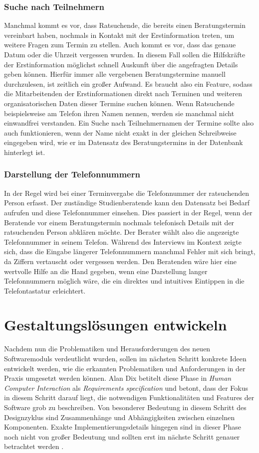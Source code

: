 \subsubsection{Suche nach Teilnehmern}
Manchmal kommt es vor, dass Ratsuchende, die bereits einen Beratungstermin
vereinbart haben, nochmals in Kontakt mit der Erstinformation treten, um
weitere Fragen zum Termin zu stellen. Auch kommt es vor, dass das genaue Datum
oder die Uhrzeit vergessen wurden. In diesem Fall sollen die Hilfskräfte der
Erstinformation möglichst schnell Auskunft über die angefragten Details geben
können. Hierfür immer alle vergebenen Beratungstermine manuell durchzulesen,
ist zeitlich ein großer Aufwand. Es braucht also ein Feature, sodass die
Mitarbeitenden der Erstinformationen direkt nach Terminen und weiteren
organisatorischen Daten dieser Termine suchen können. Wenn Ratsuchende
beispielsweise am Telefon ihren Namen nennen, werden sie manchmal nicht
einwandfrei verstanden. Ein Suche nach Teilnehmernamen der Termine sollte also
auch funktionieren, wenn der Name nicht exakt in der gleichen Schreibweise
eingegeben wird, wie er im Datensatz des Beratungstermins in der Datenbank
hinterlegt ist.

\subsubsection{Darstellung der Telefonnummern}
In der Regel wird bei einer Terminvergabe die Telefonnummer der ratsuchenden
Person erfasst. Der zuständige Studienberatende kann den Datensatz bei Bedarf
aufrufen und diese Telefonnummer einsehen. Dies passiert in der Regel, wenn der
Beratende vor einem Beratungstermin nochmals telefonisch Details mit der
ratsuchenden Person abklären möchte. Der Berater wählt also die angezeigte
Telefonnummer in seinem Telefon. Während des Interviews im Kontext zeigte sich,
dass die Eingabe längerer Telefonnummern manchmal Fehler mit sich bringt, da
Ziffern vertauscht oder vergessen werden. Den Beratenden wäre hier eine
wertvolle Hilfe an die Hand gegeben, wenn eine Darstellung langer
Telefonnummern möglich wäre, die ein direktes und intuitives Eintippen in die
Telefontastatur erleichtert.

\section{Gestaltungslösungen entwickeln}

Nachdem nun die Problematiken und Herausforderungen des neuen Softwaremoduls
verdeutlicht wurden, sollen im nächsten Schritt konkrete Ideen entwickelt
werden, wie die erkannten Problematiken und Anforderungen in der Praxis
umgesetzt werden können. Alan Dix betitelt diese Phase in \textit{Human
    Computer Interaction} als \textit{Requirements specification} und betont, dass
der Fokus in diesem Schritt darauf liegt, die notwendigen Funktionalitäten und
Features der Software grob zu beschreiben. Von besonderer Bedeutung in diesem
Schritt des Designzyklus sind Zusammenhänge und Abhängigkeiten zwischen
einzelnen Komponenten. Exakte Implementierungsdetails hingegen sind in dieser
Phase noch nicht von großer Bedeutung und sollten erst im nächste Schritt
genauer betrachtet werden \cite{hci}.

